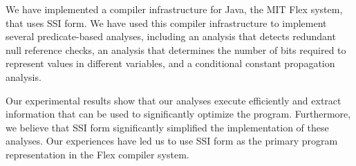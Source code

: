 We have implemented a compiler infrastructure for Java,
the MIT Flex system, that uses SSI form. We have used 
this compiler infrastructure to implement several 
predicate-based analyses, including an analysis that
detects redundant null reference checks, an
analysis that determines the number of bits
required to represent values in different variables,
and a conditional constant propagation analysis.

Our experimental results show that our analyses
execute efficiently and extract information that can
be used to significantly optimize the program.
Furthermore, we believe that SSI form significantly
simplified the implementation of these analyses.
Our experiences have led us to use SSI form 
as the primary program representation in the Flex
compiler system.
